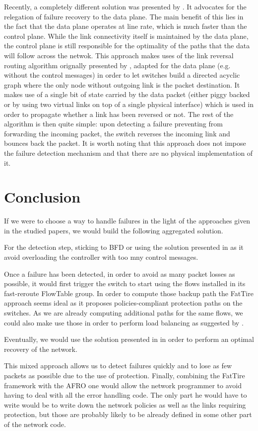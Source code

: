 \documentclass[]{IEEEtran}
\begin{document}
Recently, a completely different solution was presented by \cite{Liu:2013:ECV:2482626.2482639}. It advocates for the relegation of failure recovery to the data plane. The main benefit of this lies in the fact that the data plane operates at line rate, which is much faster than the control plane. While the link connectivity itself is maintained by the data plane, the control plane is still responsible for the optimality of the paths that the data will follow across the netwok. This approach makes uses of the link reversal routing algorithm orignally presented by \cite{1094876}, adapted for the data plane (e.g. without the control messages) in order to let switches build a directed acyclic graph where the only node without outgoing link is the packet destination. It makes use of a single bit of state carried by the data packet (either piggy backed or by using two virtual links on top of a single physical interface) which is used in order to propagate whether a link has been reversed or not. The rest of the algorithm is then quite simple: upon detecting a failure preventing from forwarding the incoming packet, the switch reverses the incoming link and bounces back the packet. It is worth noting that this approach does not impose the failure detection mechanism and that there are no physical implementation of it.

\section{Conclusion}
If we were to choose a way to handle failures in the light of the approaches given in the studied papers, we would build the following aggregated solution.

For the detection step, sticking to BFD or using the solution presented in \cite{6364688} as it avoid overloading the controller with too mny control messages.

Once a failure has been detected, in order to avoid as many packet losses as possible, it would first trigger the switch to start using the flows installed in its fast-reroute FlowTable group. In order to compute those backup path the FatTire approach seems ideal \cite{Reitblatt:2013:FDF:2491185.2491187} as it proposes policies-compliant protection paths on the switches. As we are already computing additional paths for the same flows, we could also make use those in order to perform load balancing as suggested by \cite{Suchara:2011:NAJ:1993744.1993756}.

Eventually, we would use the solution presented in \cite{Kuzniar:2013:AFR:2491185.2491218} in order to perform an optimal recovery of the network.

This mixed approach allows us to detect failures quickly and to lose as few packets as possible due to the use of protection. Finally, combining the FatTire framework with the AFRO one would allow the network programmer to avoid having to deal with all the error handling code. The only part he would have to write would be to write down the network policies as well as the links requiring protection, but those are probably likely to be already defined in some other part of the network code.


\nocite{*}

\end{document}
